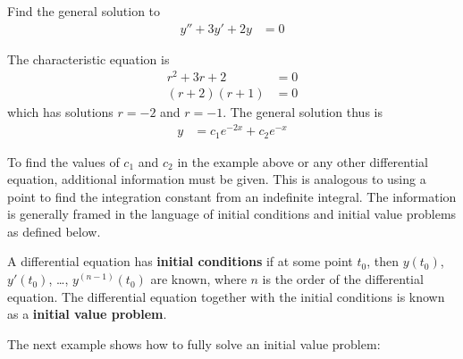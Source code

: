 \begin{example}  \label{ex:solution:DE:image}
Find the general solution to
%
\begin{align*}
y'' + 3y' + 2y & = 0
\end{align*}

\solution

The characteristic equation is
%
\begin{align*}
r^2 + 3r+2 & = 0 \\
(r+2)(r+1) & = 0
\end{align*}
which has solutions $r=-2$ and $r=-1$.  The general solution thus is
%
\begin{align*}
y & = c_1 e^{-2x} + c_2 e^{-x}
\end{align*}

\end{example}

To find the values of $c_1$ and $c_2$ in the example above or any other differential equation, additional information must be given.  This is analogous to using a point to find the integration constant from an indefinite integral.  The information is generally framed in the language of initial conditions and initial value problems as defined below.

\begin{definition}
A differential equation has \textbf{initial conditions} if at some point $t_0$, then $y(t_0)$, $y'(t_0)$, \ldots, $y^{(n-1)}(t_0)$ are known, where $n$ is the order of the differential equation.  The differential equation together with the initial conditions is known as a \textbf{initial value problem}.
\end{definition}


The next example shows how to fully solve an initial value problem:

